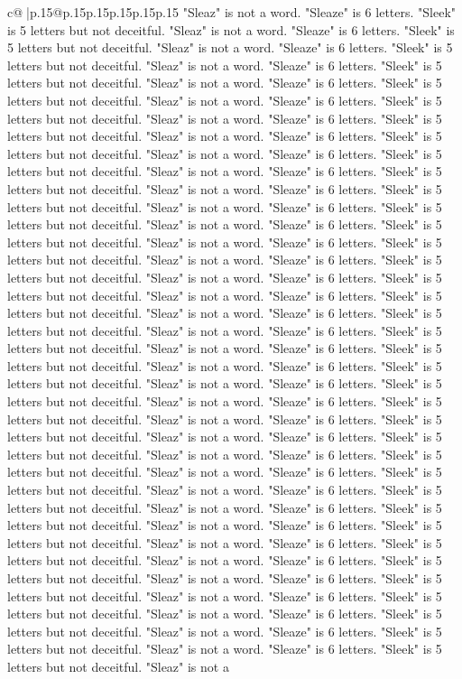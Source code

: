 \documentclass{article}
\begin{document}
{\begin{supertabular}{c@{$\;$}|p{.15\linewidth}@{}p{.15\linewidth}p{.15\linewidth}p{.15\linewidth}p{.15\linewidth}p{.15\linewidth}}
{{{"Sleaz" is not a word. "Sleaze" is 6 letters. "Sleek" is 5 letters but not deceitful. "Sleaz" is not a word. "Sleaze" is 6 letters. "Sleek" is 5 letters but not deceitful. "Sleaz" is not a word. "Sleaze" is 6 letters. "Sleek" is 5 letters but not deceitful. "Sleaz" is not a word. "Sleaze" is 6 letters. "Sleek" is 5 letters but not deceitful. "Sleaz" is not a word. "Sleaze" is 6 letters. "Sleek" is 5 letters but not deceitful. "Sleaz" is not a word. "Sleaze" is 6 letters. "Sleek" is 5 letters but not deceitful. "Sleaz" is not a word. "Sleaze" is 6 letters. "Sleek" is 5 letters but not deceitful. "Sleaz" is not a word. "Sleaze" is 6 letters. "Sleek" is 5 letters but not deceitful. "Sleaz" is not a word. "Sleaze" is 6 letters. "Sleek" is 5 letters but not deceitful. "Sleaz" is not a word. "Sleaze" is 6 letters. "Sleek" is 5 letters but not deceitful. "Sleaz" is not a word. "Sleaze" is 6 letters. "Sleek" is 5 letters but not deceitful. "Sleaz" is not a word. "Sleaze" is 6 letters. "Sleek" is 5 letters but not deceitful. "Sleaz" is not a word. "Sleaze" is 6 letters. "Sleek" is 5 letters but not deceitful. "Sleaz" is not a word. "Sleaze" is 6 letters. "Sleek" is 5 letters but not deceitful. "Sleaz" is not a word. "Sleaze" is 6 letters. "Sleek" is 5 letters but not deceitful. "Sleaz" is not a word. "Sleaze" is 6 letters. "Sleek" is 5 letters but not deceitful. "Sleaz" is not a word. "Sleaze" is 6 letters. "Sleek" is 5 letters but not deceitful. "Sleaz" is not a word. "Sleaze" is 6 letters. "Sleek" is 5 letters but not deceitful. "Sleaz" is not a word. "Sleaze" is 6 letters. "Sleek" is 5 letters but not deceitful. "Sleaz" is not a word. "Sleaze" is 6 letters. "Sleek" is 5 letters but not deceitful. "Sleaz" is not a word. "Sleaze" is 6 letters. "Sleek" is 5 letters but not deceitful. "Sleaz" is not a word. "Sleaze" is 6 letters. "Sleek" is 5 letters but not deceitful. "Sleaz" is not a word. "Sleaze" is 6 letters. "Sleek" is 5 letters but not deceitful. "Sleaz" is not a word. "Sleaze" is 6 letters. "Sleek" is 5 letters but not deceitful. "Sleaz" is not a word. "Sleaze" is 6 letters. "Sleek" is 5 letters but not deceitful. "Sleaz" is not a word. "Sleaze" is 6 letters. "Sleek" is 5 letters but not deceitful. "Sleaz" is not a word. "Sleaze" is 6 letters. "Sleek" is 5 letters but not deceitful. "Sleaz" is not a word. "Sleaze" is 6 letters. "Sleek" is 5 letters but not deceitful. "Sleaz" is not a word. "Sleaze" is 6 letters. "Sleek" is 5 letters but not deceitful. "Sleaz" is not a word. "Sleaze" is 6 letters. "Sleek" is 5 letters but not deceitful. "Sleaz" is not a word. "Sleaze" is 6 letters. "Sleek" is 5 letters but not deceitful. "Sleaz" is not a word. "Sleaze" is 6 letters. "Sleek" is 5 letters but not deceitful. "Sleaz" is not a word. "Sleaze" is 6 letters. "Sleek" is 5 letters but not deceitful. "Sleaz" is not a word. "Sleaze" is 6 letters. "Sleek" is 5 letters but not deceitful. "Sleaz" is not a word. "Sleaze" is 6 letters. "Sleek" is 5 letters but not deceitful. "Sleaz" is not a word. "Sleaze" is 6 letters. "Sleek" is 5 letters but not deceitful. "Sleaz" is not a word. "Sleaze" is 6 letters. "Sleek" is 5 letters but not deceitful. "Sleaz" is not a }}}
\end{supertabular}}
\end{document}
